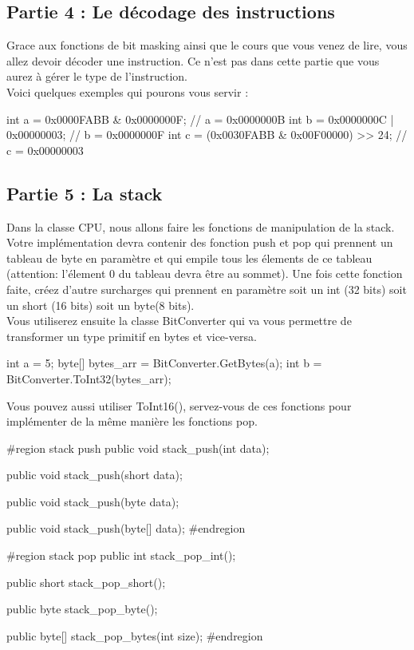 \subsection{Partie 4 : Le décodage des instructions}

Grace aux fonctions de bit masking ainsi que le cours que vous venez de lire, vous allez devoir décoder une instruction.  Ce n'est pas dans cette partie que vous aurez à gérer le type de l'instruction.\\

Voici quelques exemples qui pourons vous servir :
\begin{code}
int a = 0x0000FABB & 0x0000000F; // a = 0x0000000B
int b = 0x0000000C | 0x00000003; // b = 0x0000000F
int c = (0x0030FABB & 0x00F00000) >> 24; // c = 0x00000003

\end{code}


\subsection{Partie 5 : La stack}
Dans la classe CPU, nous allons faire les fonctions de manipulation de la stack. Votre implémentation devra contenir des fonction push et pop qui prennent un tableau de byte en paramètre et qui empile tous les élements de ce tableau (attention: l'élement 0 du tableau devra être au sommet). 
Une fois cette fonction faite, créez d'autre surcharges qui prennent en paramètre soit un int (32 bits) soit un short (16 bits) soit un byte(8 bits). \\
Vous utiliserez ensuite la classe BitConverter qui va vous permettre de transformer un type primitif en bytes et vice-versa.
\begin{code}
int a = 5;
byte[] bytes_arr = BitConverter.GetBytes(a);
int b = BitConverter.ToInt32(bytes_arr);
\end{code}
Vous pouvez aussi utiliser ToInt16(), servez-vous de ces fonctions pour implémenter de la même manière les fonctions pop.
\begin{code}
#region stack push
        public void stack_push(int data);

        public void stack_push(short data);

        public void stack_push(byte data);

        public void stack_push(byte[] data);
#endregion

#region stack pop
        public int stack_pop_int();
        
        public short stack_pop_short();
        
        public byte stack_pop_byte();
        
        public byte[] stack_pop_bytes(int size);
#endregion
\end{code}


